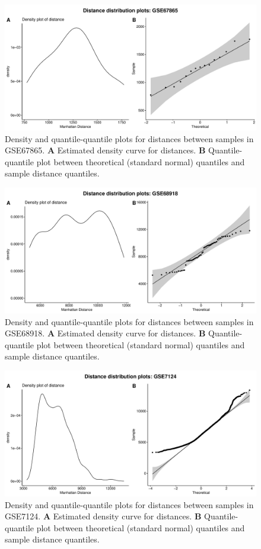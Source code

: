 \documentclass[10pt,letterpaper]{article}\usepackage[]{graphicx}\usepackage[]{color}
\begin{document}
\begin{figure}[H]
	\includegraphics[width=\textwidth]{manhattan-distance_hist_GSE67865.pdf}
	\caption{Density and quantile-quantile plots for distances between samples in GSE67865. \textbf{A} Estimated density curve for distances. \textbf{B} Quantile-quantile plot between theoretical (standard normal) quantiles and sample distance quantiles.}
\end{figure}

\begin{figure}[H]
	\includegraphics[width=\textwidth]{manhattan-distance_hist_GSE68918.pdf}
	\caption{Density and quantile-quantile plots for distances between samples in GSE68918. \textbf{A} Estimated density curve for distances. \textbf{B} Quantile-quantile plot between theoretical (standard normal) quantiles and sample distance quantiles.}
\end{figure}

\begin{figure}[H]
	\includegraphics[width=\textwidth]{manhattan-distance_hist_GSE7124.pdf}
	\caption{Density and quantile-quantile plots for distances between samples in GSE7124. \textbf{A} Estimated density curve for distances. \textbf{B} Quantile-quantile plot between theoretical (standard normal) quantiles and sample distance quantiles.}
\end{figure}
\end{document}
